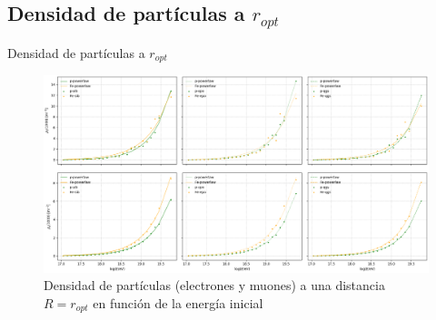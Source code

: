 \documentclass[11pt,table,compress]{beamer}
\begin{document}
	\subsection[Densidad a $r_{opt}$]{Densidad de partículas a $r_{opt}$}
	\begin{frame}{Densidad de partículas a $r_{opt}$}
		\begin{figure}[h] 
		\centering
		\includegraphics[height=0.7\textheight, width=\textwidth]{Figuras/density_pFe}
		\caption{Densidad de partículas (electrones y muones) a una distancia $R=r_{opt}$ en función de la energía inicial}
		\label{fig:density}
		\end{figure}
	\end{frame}
	
\end{document}
